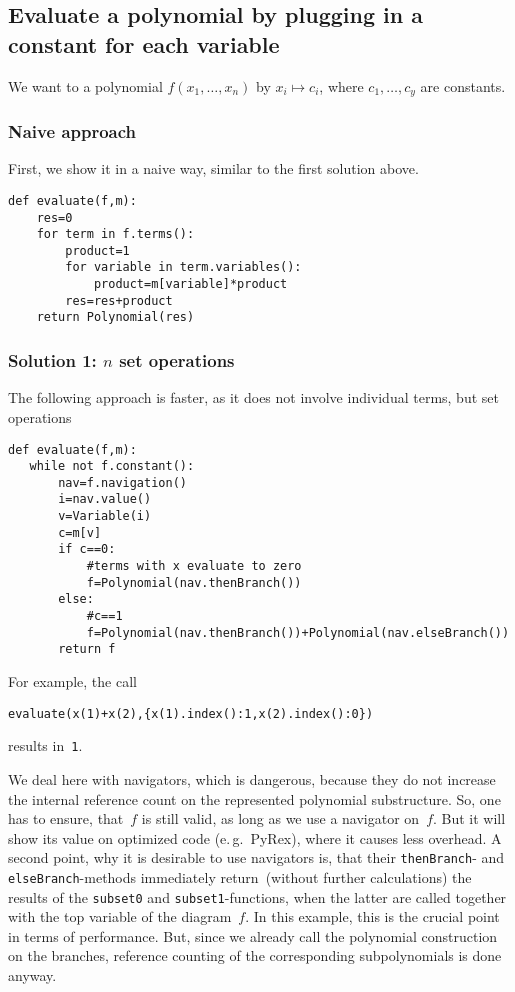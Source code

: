 \documentclass[]{article}
\begin{document}
\subsection{Evaluate a polynomial by plugging in a constant for each variable}
    We want to a polynomial
    $f(x_1,\ldots, x_n)$
    by
    $x_i\mapsto c_i$, where
    $c_1,\ldots, c_y$ are constants.

\subsubsection{Naive approach}
First, we show it in a naive way, similar to the first solution above.

\begin{lstlisting}
def evaluate(f,m):
    res=0
    for term in f.terms():
        product=1
        for variable in term.variables():
            product=m[variable]*product
        res=res+product
    return Polynomial(res)
\end{lstlisting}


\subsubsection{Solution 1: $n$ set operations}
The following approach is faster, as it does not involve individual terms, but set operations

\begin{lstlisting}
def evaluate(f,m):
   while not f.constant():
       nav=f.navigation()
       i=nav.value()
       v=Variable(i)
       c=m[v]
       if c==0:
           #terms with x evaluate to zero
           f=Polynomial(nav.thenBranch())
       else:
           #c==1
           f=Polynomial(nav.thenBranch())+Polynomial(nav.elseBranch())
       return f   
\end{lstlisting}
For example, the call
\begin{lstlisting}
evaluate(x(1)+x(2),{x(1).index():1,x(2).index():0})  
\end{lstlisting}
results in~\lstinline|1|.



We deal here with navigators, which is dangerous, because
they do not increase the internal reference count on the represented polynomial
substructure. So, one has
to ensure, that~$f$ is still valid, as long as we use a navigator on~$f$.
But it will show its value on optimized code (e.\,g.\ PyRex), where it causes
less overhead. 
A second point, why it is desirable to use navigators is, that their
\lstinline|thenBranch|- and \lstinline|elseBranch|-methods immediately return~(without
further calculations) the
results of the \lstinline|subset0| and \lstinline|subset1|-functions, when the latter are
called together  with the top variable of the diagram~$f$.
%
In this example, this is the crucial point in terms of performance.
But, since we already call the polynomial construction on the branches,
reference counting of the corresponding subpolynomials is done anyway.
\end{document}
